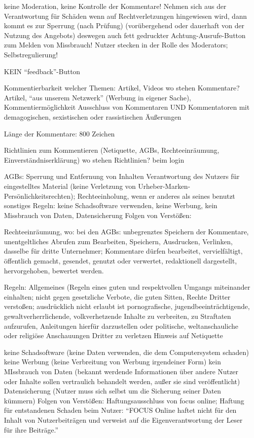 
keine Moderation, keine Kontrolle der Kommentare! Nehmen sich aus der Verantwortung für Schäden
wenn auf Rechtverletzungen hingewiesen wird, dann kommt es zur Sperrung (nach Prüfung) (vorübergehend oder dauerhaft von der Nutzung des Angebots)
deswegen auch fett gedruckter Achtung-Ausrufe-Button zum Melden von Missbrauch! Nutzer stecken in der Rolle des Moderators; Selbstregulierung!



KEIN ``feedback''-Button



Kommentierbarkeit welcher Themen: Artikel, Videos
wo stehen Kommentare? Artikel, ``aus unserem Netzwerk'' (Werbung in eigener Sache), Kommentiermöglichkeit
Ausschluss von Kommentaren UND Kommentatoren mit demagogischen, sexistischen oder rassistischen Äußerungen



Länge der Kommentare: 800 Zeichen

Richtlinien zum Kommentieren (Netiquette, AGBs, Rechteeinräumung, Einverständniserklärung)
wo stehen Richtlinien? beim login


AGBs: Sperrung und Entfernung von Inhalten 
			Verantwortung des Nutzers für eingestelltes Material (keine Verletzung von Urheber-Marken-Persönlichkeitsrechten); Rechteeinholung, wenn er anderes als seines 					benutzt
			sonstiges Regeln: keine Schadsoftware verwenden, keine Werbung, kein Missbrauch von Daten, Datensicherung 
			Folgen von Verstößen: 
			
			
			
	Rechteeinräumung, wo: bei den AGBs: unbegrenztes Speichern der Kommentare, unentgeltliches Abrufen zum Bearbeiten, Speichern, Ausdrucken, Verlinken, 										dasselbe für dritte Unternehmer; Kommentare dürfen bearbeitet, vervielfältigt, öffentlich gemacht, gesendet, genutzt oder 										verwertet, redaktionell dargestellt, hervorgehoben, bewertet werden.

Regeln: 
	Allgemeines (Regeln eines guten und respektvollen Umgangs miteinander einhalten; nicht gegen gesetzliche Verbote, die guten Sitten, Rechte Dritter verstoßen; 				ausdrücklich nicht erlaubt ist pornografische, jugendbeeinträchtigende, gewaltverherrlichende, volkverhetzende Inhalte zu verbreiten, zu Straftaten aufzurufen, 				Anleitungen hierfür darzustellen oder politische, weltanschauliche oder religiöse Anschauungen Dritter zu verletzen
	Hinweis auf Netiquette
	
	keine Schadsoftware (keine Daten verwenden, die dem Computersystem schaden)
	keine Werbung (keine Verbreitung von Werbung irgendeiner Form)
	kein MIssbrauch von Daten (bekannt werdende Informationen über andere Nutzer oder Inhalte sollen vertraulich behandelt werden, außer sie sind veröffentlicht)
	Datensicherung (Nutzer muss sich selbst um die Sicherung seiner Daten kümmern)
	Folgen von Verstößen: Haftungsausschluss von focus online; Haftung für entstandenen Schaden beim Nutzer: ``FOCUS Online haftet nicht für den Inhalt von Nutzerbeiträgen und verweist auf die Eigenverantwortung der Leser für ihre Beiträge.''

